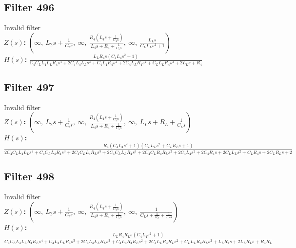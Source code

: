 \documentclass{article}
\begin{document}
\subsection*{Filter 496}
Invalid filter \\ 
\textbf{$Z(s)$:} $\left( \infty, \  L_{2} s + \frac{1}{C_{2} s}, \  \infty, \  \frac{R_{4} \left(L_{4} s + \frac{1}{C_{4} s}\right)}{L_{4} s + R_{4} + \frac{1}{C_{4} s}}, \  \infty, \  \frac{L_{L} s}{C_{L} L_{L} s^{2} + 1}\right)$ \\ 
\textbf{$H(s)$:} $\frac{L_{L} R_{4} s \left(C_{4} L_{4} s^{2} + 1\right)}{C_{4} C_{L} L_{4} L_{L} R_{4} s^{4} + 2 C_{4} L_{4} L_{L} s^{3} + C_{4} L_{4} R_{4} s^{2} + 2 C_{4} L_{L} R_{4} s^{2} + C_{L} L_{L} R_{4} s^{2} + 2 L_{L} s + R_{4}}$ \\ 
\subsection*{Filter 497}
Invalid filter \\ 
\textbf{$Z(s)$:} $\left( \infty, \  L_{2} s + \frac{1}{C_{2} s}, \  \infty, \  \frac{R_{4} \left(L_{4} s + \frac{1}{C_{4} s}\right)}{L_{4} s + R_{4} + \frac{1}{C_{4} s}}, \  \infty, \  L_{L} s + R_{L} + \frac{1}{C_{L} s}\right)$ \\ 
\textbf{$H(s)$:} $\frac{R_{4} \left(C_{4} L_{4} s^{2} + 1\right) \left(C_{L} L_{L} s^{2} + C_{L} R_{L} s + 1\right)}{2 C_{4} C_{L} L_{4} L_{L} s^{4} + C_{4} C_{L} L_{4} R_{4} s^{3} + 2 C_{4} C_{L} L_{4} R_{L} s^{3} + 2 C_{4} C_{L} L_{L} R_{4} s^{3} + 2 C_{4} C_{L} R_{4} R_{L} s^{2} + 2 C_{4} L_{4} s^{2} + 2 C_{4} R_{4} s + 2 C_{L} L_{L} s^{2} + C_{L} R_{4} s + 2 C_{L} R_{L} s + 2}$ \\ 
\subsection*{Filter 498}
Invalid filter \\ 
\textbf{$Z(s)$:} $\left( \infty, \  L_{2} s + \frac{1}{C_{2} s}, \  \infty, \  \frac{R_{4} \left(L_{4} s + \frac{1}{C_{4} s}\right)}{L_{4} s + R_{4} + \frac{1}{C_{4} s}}, \  \infty, \  \frac{1}{C_{L} s + \frac{1}{R_{L}} + \frac{1}{L_{L} s}}\right)$ \\ 
\textbf{$H(s)$:} $\frac{L_{L} R_{4} R_{L} s \left(C_{4} L_{4} s^{2} + 1\right)}{C_{4} C_{L} L_{4} L_{L} R_{4} R_{L} s^{4} + C_{4} L_{4} L_{L} R_{4} s^{3} + 2 C_{4} L_{4} L_{L} R_{L} s^{3} + C_{4} L_{4} R_{4} R_{L} s^{2} + 2 C_{4} L_{L} R_{4} R_{L} s^{2} + C_{L} L_{L} R_{4} R_{L} s^{2} + L_{L} R_{4} s + 2 L_{L} R_{L} s + R_{4} R_{L}}$ \\ 
\end{document}
